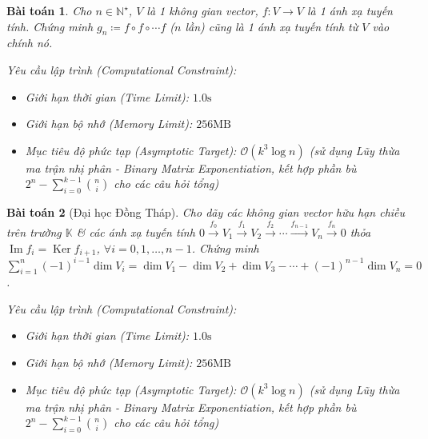 \documentclass{article}
\newtheorem{baitoan}{Bài toán}
\begin{document}
\begin{baitoan}
	Cho $n\in\mathbb{N}^\star$, $V$ là 1 không gian vector, $f:V\to V$ là 1 ánh xạ tuyến tính. Chứng minh $g_n\coloneqq f\circ f\circ\cdots f$ ($n$ lần) cũng là 1 ánh xạ tuyến tính từ $V$ vào chính nó.

    \vspace{0.5em}
    \emph{Yêu cầu lập trình (Computational Constraint):}
    \begin{itemize}
        \item Giới hạn thời gian (Time Limit): $1.0\mathrm{s}$
        \item Giới hạn bộ nhớ (Memory Limit): $256\mathrm{MB}$
        \item Mục tiêu độ phức tạp (Asymptotic Target): $\mathcal{O}(k^3 \log n)$ (sử dụng Lũy thừa ma trận nhị phân - Binary Matrix Exponentiation, kết hợp phần bù $2^n - \sum_{i=0}^{k-1} \binom{n}{i}$ cho các câu hỏi tổng)
    \end{itemize}
\end{baitoan}


\begin{baitoan}[Đại học Đồng Tháp]
	Cho dãy các không gian vector hữu hạn chiều trên trường $\mathbb{K}$ \& các ánh xạ tuyến tính $0\xrightarrow{f_0}V_1\xrightarrow{f_1}V_2\xrightarrow{f_2}\cdots\xrightarrow{f_{n-1}}V_n\xrightarrow{f_n}0$ thỏa $\operatorname{Im}f_i = \operatorname{Ker}f_{i+1}$, $\forall i = 0,1,\ldots,n-1$. Chứng minh $\sum_{i=1}^n (-1)^{i-1}\dim V_i = \dim V_1 - \dim V_2 + \dim V_3 - \cdots + (-1)^{n-1}\dim V_n = 0$.

    \vspace{0.5em}
    \emph{Yêu cầu lập trình (Computational Constraint):}
    \begin{itemize}
        \item Giới hạn thời gian (Time Limit): $1.0\mathrm{s}$
        \item Giới hạn bộ nhớ (Memory Limit): $256\mathrm{MB}$
        \item Mục tiêu độ phức tạp (Asymptotic Target): $\mathcal{O}(k^3 \log n)$ (sử dụng Lũy thừa ma trận nhị phân - Binary Matrix Exponentiation, kết hợp phần bù $2^n - \sum_{i=0}^{k-1} \binom{n}{i}$ cho các câu hỏi tổng)
    \end{itemize}
\end{baitoan}
\end{document}

